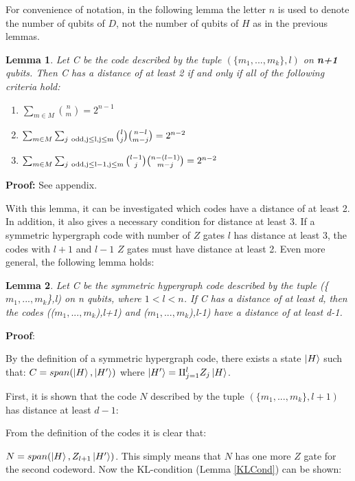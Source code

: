 \documentclass[12pt]{iopart}
\newtheorem{lemma}{Lemma}
\begin{document}
For convenience of notation, in the following lemma the letter $n$ is used to denote the number of qubits of $D$, not the number of qubits of $H$ as in the previous lemmas.

\begin{lemma}
\label{eccBinomial}
Let C be the code described by the tuple $(\{m_1,...,m_k\},l)$ on \textbf{n+1} qubits.
Then C has a distance of at least 2 if and only if all of the following criteria hold:

\begin{enumerate}
\item $\sum_{m \in M} {n \choose m} = 2^{n-1}$
\item $\sum_{m \in M}\sum_{j \ \rm{odd}, j \leq l, j \leq m } {l \choose j}{n-l \choose m-j} = 2^{n-2}$
\item $\sum_{m \in M}\sum_{j \ \rm{odd}, j \leq l-1, j \leq m} {l-1 \choose j}{n-(l-1) \choose m-j} = 2^{n-2}$
\end{enumerate}
\end{lemma}
\textbf{Proof:} See appendix.

With this lemma, it can be investigated which codes have a distance of at least 2.
In addition, it also gives a necessary condition for distance at least 3.
If a symmetric hypergraph code with number of $Z$ gates $l$ has distance at least 3, the codes with $l+1$ and $l-1$ $Z$ gates must have distance at least 2. Even more general, the following lemma holds:

\begin{samepage}
\begin{lemma}
\label{dist3condition}
Let C be the symmetric hypergraph code described by the tuple (\{$m_1,...,m_k$\},l) on n qubits, where $1<l<n$.
\nopagebreak
If C has a distance of at least d, then the codes (($m_1,...,m_k$),l+1) and
\nopagebreak
($m_1,...,m_k$),l-1) have a distance of at least d-1.
\end{lemma}
\end{samepage}

\textbf{Proof}:

By the definition of a symmetric hypergraph code, there exists a state $\ket{H}$ such that: $C = span(\ket{H},\ket{H^\prime})$ where $\ket{H^\prime} = \Pi_{j=1}^l Z_j \ket{H}$.

First, it is shown that the code $N$ described by the tuple $(\{m_1,...,m_k\},l+1)$ has distance at least $d-1$:

From the definition of the codes it is clear that:

$N = span(\ket{H},Z_{l+1}\ket{H^\prime})$. This simply means that $N$ has one more $Z$ gate for the second codeword. Now the KL-condition (Lemma \ref{KLCond}) can be shown:
\end{document}
